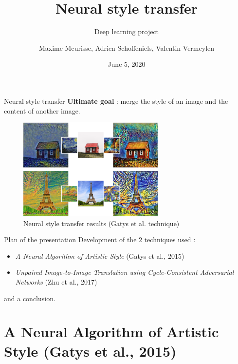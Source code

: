 \documentclass[12pt]{beamer}
\title{Neural style transfer}
\subtitle{Deep learning project}
\author{Maxime Meurisse, Adrien Schoffeniels, Valentin Vermeylen}
\institute{University of Liège}
\date{June 5, 2020}
\begin{document}
    
    \maketitle
    
    
    \begin{frame}{Neural style transfer}
        \textbf{Ultimate goal} : merge the style of an image and the content of another image.
        
        \begin{figure}[H]
            \centering
            \includegraphics[width=0.65\textwidth]{resources/gatys/gatys-final.png}
            \caption*{Neural style transfer results (Gatys et al. technique)}
        \end{figure}
    \end{frame}
    
    
    \begin{frame}{Plan of the presentation}
        Development of the 2 techniques used :
        
        \begin{itemize}
            \item \emph{A Neural Algorithm of Artistic Style} (Gatys et al., 2015)
            \item \emph{Unpaired Image-to-Image Translation using Cycle-Consistent Adversarial Networks} (Zhu et al., 2017)
        \end{itemize}
        
        and a conclusion.
    \end{frame}
    
    
    \section{A Neural Algorithm of Artistic Style (Gatys et al., 2015)}
    
\end{document}
